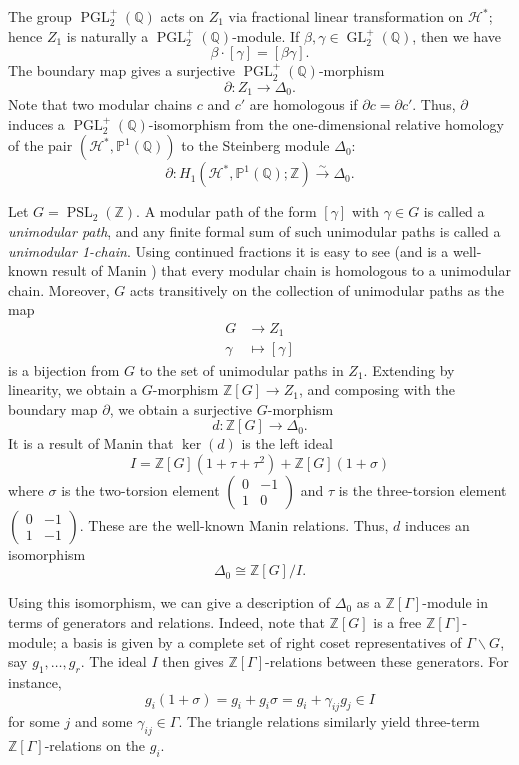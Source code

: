 \documentclass{amsart}
\theoremstyle{plain}
\theoremstyle{definition}
\renewcommand{\H}{\mathcal H}
\newcommand{\Z}{{\mathbb Z}}
\newcommand{\Q}{{\mathbb Q}}
\renewcommand{\P}{{\mathbb P}}
\newcommand{\maps}{\rightarrow}
\newcommand{\lra}{\longrightarrow}
\newcommand{\psmallmat}[4]{\left( \begin{smallmatrix} #1 & #2 \\ #3 & #4 \end{smallmatrix} \right)}
\DeclareMathOperator{\PGL}{PGL}
\DeclareMathOperator{\GL}{GL}
\DeclareMathOperator{\PSL}{PSL}
\begin{document}
The group  $\PGL_2^+(\Q)$ acts on $Z_1$ via fractional linear transformation on $\H^*$; hence $Z_1$ is naturally a $\PGL_2^+(\Q)$-module.  If $\beta, \gamma \in \GL_2^+(\Q)$, then we have
$$
\beta \cdot [\gamma] = [ \beta \gamma].
$$
The boundary map gives a surjective $\PGL_2^+(\Q)$-morphism
$$
\partial : Z_1 \lra \Delta_0.
$$
Note that two modular chains $c$ and $c'$ are homologous if $\partial c =
\partial c'$.  Thus, $\partial$ induces a $\PGL_2^+(\Q)$-isomorphism
from the one-dimensional relative homology of the pair
$(\H^*,\P^1(\Q))$ to the Steinberg module $\Delta_0$:
$$
\partial : H_1(\H^*,\P^1(\Q);\Z) \stackrel{\sim}{\lra} \Delta_0.
$$

Let $G = \PSL_2(\Z)$.  A modular path of the form $[\gamma]$ with $\gamma \in G$ is called a {\it unimodular path}, and any finite formal sum of such unimodular paths is called a {\it unimodular 1-chain}. Using continued fractions it is easy to see (and is a well-known result of Manin \cite{Manin}) that every modular chain is homologous to a unimodular chain.  Moreover, $G$ acts transitively on the collection of unimodular paths as the map
\begin{align*}
G &\maps Z_1 \\
\gamma &\mapsto [\gamma]
\end{align*}
is a bijection from $G$ to the set of unimodular paths in $Z_1$.  Extending by linearity, we obtain a $G$-morphism $\Z[G] \maps Z_1$, and composing with the boundary map $\partial$, we obtain a surjective $G$-morphism
$$
d : \Z[G] \lra \Delta_0.
$$
It is a result of Manin \cite{Manin} that $\ker(d)$ is the left ideal
$$
I = \Z[G](1 + \tau + \tau^2) + \Z[G](1 + \sigma)
$$
where $\sigma$ is the two-torsion element $\psmallmat{0}{-1}{1}{0}$ and 
$\tau$ is the three-torsion element $\psmallmat{0}{-1}{1}{-1}$.  These are the well-known Manin relations.  Thus, $d$ induces an isomorphism 
$$\Delta_0 \cong \Z[G]/I.$$

Using this isomorphism, we can give a description of $\Delta_0$ as a $\Z[\Gamma]$-module in terms of generators and relations. Indeed, note that $\Z[G]$ is a free $\Z[\Gamma]$-module; a basis is given by a complete set of right coset representatives of $\Gamma \backslash G$, say $g_1, \dots, g_r$.  The ideal $I$ then gives $\Z[\Gamma]$-relations between these generators. For instance,
$$
g_i (1 + \sigma) = g_i + g_i \sigma = g_i + \gamma_{ij} g_j \in I
$$
for some $j$ and some $\gamma_{ij} \in \Gamma$.  The triangle relations similarly yield three-term $\Z[\Gamma]$-relations on the $g_i$.
\end{document}

